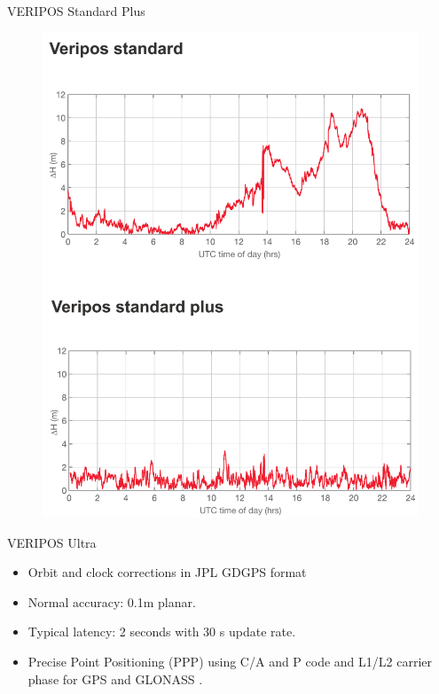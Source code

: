 \documentclass[12pt]{beamer}
\begin{document}
\begin{frame}[plain]{VERIPOS Standard Plus}
	
	\begin{figure}
		\includegraphics[height=0.9\textheight]{pic/StdPlus.png}
	\end{figure}

\end{frame}


\begin{frame}{VERIPOS Ultra}
 
	\begin{itemize}	
		\item Orbit and clock corrections in JPL GDGPS format
		\item Normal accuracy: 0.1m planar. 
		\item Typical latency: 2 seconds with 30 s update rate.%
		\item Precise Point Positioning (PPP) using C/A and P code and L1/L2 carrier phase for GPS and GLONASS .
	\end{itemize}	
	
\end{frame}	
\end{document}
